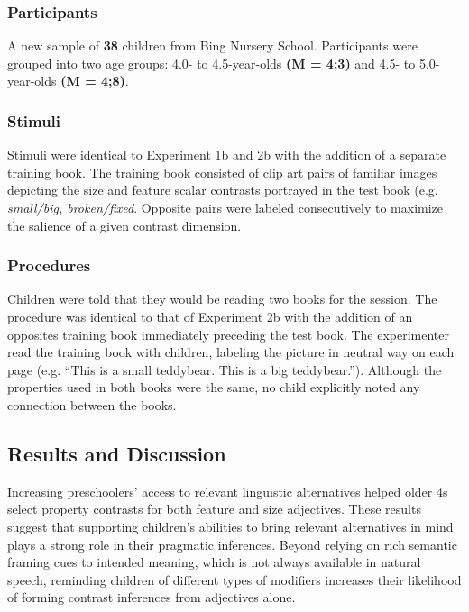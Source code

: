 \documentclass[10pt,letterpaper]{article}
\begin{document}
\subsubsection{Participants}

A new sample of \textbf{38} children from Bing Nursery School. Participants were grouped into two age groups: 4.0- to 4.5-year-olds \textbf{(M = 4;3)} and 4.5- to 5.0-year-olds \textbf{(M = 4;8)}.

\subsubsection{Stimuli}

Stimuli were identical to Experiment 1b and 2b with the addition of a separate training book.  The training book consisted of clip art pairs of familiar images depicting the size and feature scalar contrasts portrayed in the test book (e.g. \emph{small/big, broken/fixed}.  Opposite pairs were labeled consecutively to maximize the salience of a given contrast dimension. 

\subsubsection{Procedures}

Children were told that they would be reading two books for the session.  The procedure was identical to that of Experiment 2b with the addition of an opposites training book immediately preceding the test book. The experimenter read the training book with children, labeling the picture in neutral way on each page (e.g. ``This is a small teddybear. This is a big teddybear.'').  Although the properties used in both books were the same, no child explicitly noted any connection between the books. 

\subsection{Results and Discussion}

Increasing preschoolers' access to relevant linguistic alternatives helped older 4s select property contrasts for both feature and size adjectives.  These results suggest that supporting children's abilities to bring relevant alternatives in mind plays a strong role in their pragmatic inferences. Beyond relying on rich semantic framing cues to intended meaning, which is not always available in natural speech, reminding children of different types of modifiers increases their likelihood of forming contrast inferences from adjectives alone. 
\end{document}
